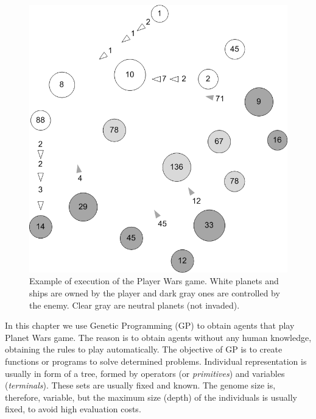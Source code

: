 \begin{figure}
\includegraphics[scale =0.7] {gfx/rts/naves.png}

\caption{Example of execution of the Player Wars game. White planets and ships are owned by the player and dark gray ones are controlled by the enemy. Clear gray are neutral planets (not invaded).}
\label{fig:naves}
\end{figure}


In this chapter we use Genetic Programming (GP) to obtain agents that play
Planet Wars game. The reason is to obtain agents without any human knowledge, obtaining the rules to play automatically.%
The objective of GP is to create functions or programs to solve determined problems. Individual representation is usually in form of a tree, formed by operators (or {\em primitives}) and variables ({\em terminals}). These sets are usually fixed and known. The genome size is, therefore, variable, but the maximum size (depth) of the individuals is usually fixed, to avoid high evaluation costs. %


